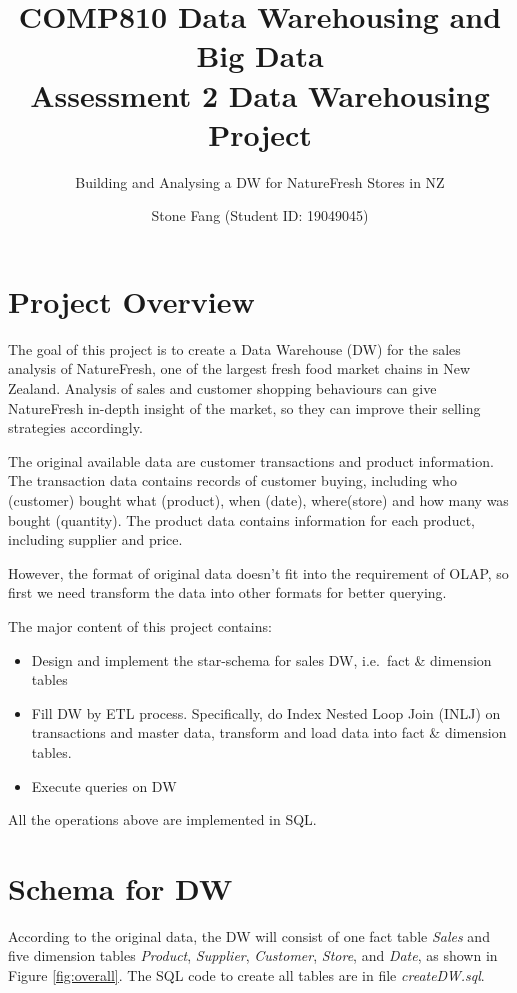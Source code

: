 \documentclass[
  a4paper,
]{article}
\title{    \textbf{COMP810 Data Warehousing and Big Data \\
    Assessment 2 Data Warehousing Project}}
\subtitle{Building and Analysing a DW for NatureFresh Stores in NZ}
\author{Stone Fang (Student ID: 19049045)}
\date{}
\providecommand{\tightlist}{%
  \setlength{\itemsep}{0pt}\setlength{\parskip}{0pt}}
\begin{document}
\maketitle

\hypertarget{project-overview}{%
\section{Project Overview}\label{project-overview}}

The goal of this project is to create a Data Warehouse (DW) for the
sales analysis of NatureFresh, one of the largest fresh food market
chains in New Zealand. Analysis of sales and customer shopping
behaviours can give NatureFresh in-depth insight of the market, so they
can improve their selling strategies accordingly.

The original available data are customer transactions and product
information. The transaction data contains records of customer buying,
including who (customer) bought what (product), when (date),
where(store) and how many was bought (quantity). The product data
contains information for each product, including supplier and price.

However, the format of original data doesn't fit into the requirement of
OLAP, so first we need transform the data into other formats for better
querying.

The major content of this project contains:

\begin{itemize}
\tightlist
\item
  Design and implement the star-schema for sales DW, i.e.~fact \&
  dimension tables
\item
  Fill DW by ETL process. Specifically, do Index Nested Loop Join (INLJ)
  on transactions and master data, transform and load data into fact \&
  dimension tables.
\item
  Execute queries on DW
\end{itemize}

All the operations above are implemented in SQL.

\hypertarget{schema-for-dw}{%
\section{Schema for DW}\label{schema-for-dw}}

According to the original data, the DW will consist of one fact table
\emph{Sales} and five dimension tables \emph{Product}, \emph{Supplier},
\emph{Customer}, \emph{Store}, and \emph{Date}, as shown in Figure
\ref{fig:overall}. The SQL code to create all tables are in file
\emph{createDW.sql}.
\end{document}
